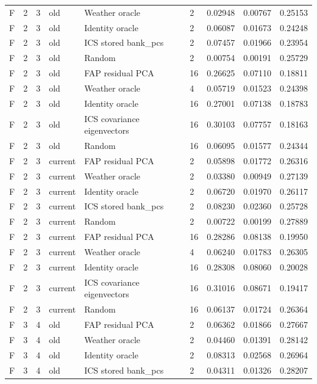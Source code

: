 \begin{tabular}{lllllllll}
F & 2 & 3 & old & Weather oracle & 2 & 0.02948 & 0.00767 & 0.25153 \\
F & 2 & 3 & old & Identity oracle & 2 & 0.06087 & 0.01673 & 0.24248 \\
F & 2 & 3 & old & ICS stored bank\_pcs & 2 & 0.07457 & 0.01966 & 0.23954 \\
F & 2 & 3 & old & Random & 2 & 0.00754 & 0.00191 & 0.25729 \\
F & 2 & 3 & old & FAP residual PCA & 16 & 0.26625 & 0.07110 & 0.18811 \\
F & 2 & 3 & old & Weather oracle & 4 & 0.05719 & 0.01523 & 0.24398 \\
F & 2 & 3 & old & Identity oracle & 16 & 0.27001 & 0.07138 & 0.18783 \\
F & 2 & 3 & old & ICS covariance eigenvectors & 16 & 0.30103 & 0.07757 & 0.18163 \\
F & 2 & 3 & old & Random & 16 & 0.06095 & 0.01577 & 0.24344 \\
F & 2 & 3 & current & FAP residual PCA & 2 & 0.05898 & 0.01772 & 0.26316 \\
F & 2 & 3 & current & Weather oracle & 2 & 0.03380 & 0.00949 & 0.27139 \\
F & 2 & 3 & current & Identity oracle & 2 & 0.06720 & 0.01970 & 0.26117 \\
F & 2 & 3 & current & ICS stored bank\_pcs & 2 & 0.08230 & 0.02360 & 0.25728 \\
F & 2 & 3 & current & Random & 2 & 0.00722 & 0.00199 & 0.27889 \\
F & 2 & 3 & current & FAP residual PCA & 16 & 0.28286 & 0.08138 & 0.19950 \\
F & 2 & 3 & current & Weather oracle & 4 & 0.06240 & 0.01783 & 0.26305 \\
F & 2 & 3 & current & Identity oracle & 16 & 0.28308 & 0.08060 & 0.20028 \\
F & 2 & 3 & current & ICS covariance eigenvectors & 16 & 0.31016 & 0.08671 & 0.19417 \\
F & 2 & 3 & current & Random & 16 & 0.06137 & 0.01724 & 0.26364 \\
F & 3 & 4 & old & FAP residual PCA & 2 & 0.06362 & 0.01866 & 0.27667 \\
F & 3 & 4 & old & Weather oracle & 2 & 0.04460 & 0.01391 & 0.28142 \\
F & 3 & 4 & old & Identity oracle & 2 & 0.08313 & 0.02568 & 0.26964 \\
F & 3 & 4 & old & ICS stored bank\_pcs & 2 & 0.04311 & 0.01326 & 0.28207 \\

\end{tabular}
